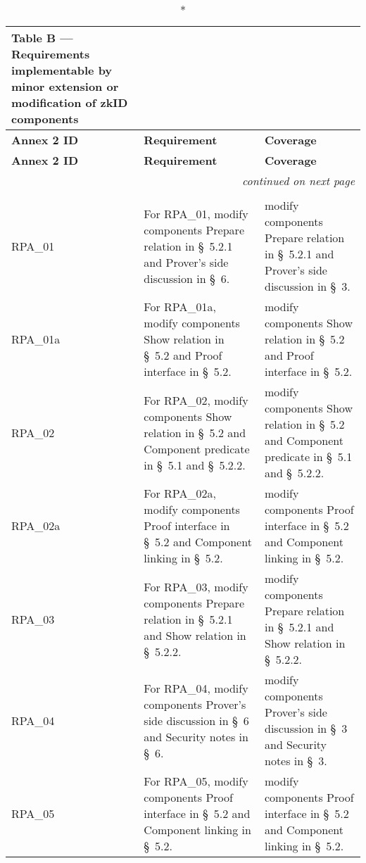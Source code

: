 \clearpage
\begin{landscape}
\small
\begin{longtable}{p{3cm} p{10cm} p{7cm}}
\caption*{Table B — Requirements implementable by minor extension or modification of zkID components}\\
\toprule
\textbf{Annex 2 ID} &
\textbf{Requirement} &
\textbf{Coverage} \\
\midrule
\endfirsthead
\toprule
\textbf{Annex 2 ID} &
\textbf{Requirement} &
\textbf{Coverage} \\
\midrule
\endhead
\midrule
\multicolumn{3}{r}{\emph{continued on next page}}\\
\bottomrule
\endfoot
\bottomrule
\endlastfoot

\multicolumn{3}{l}{\textbf{Topic 6 — Relying Party authentication and User approval}}\\

RPA\_01 &
For RPA\_01, modify components Prepare relation in \S~5.2.1 and Prover's side discussion in \S~6. &
modify components Prepare relation in \S~5.2.1 and Prover's side discussion in \S~3. \\

RPA\_01a &
For RPA\_01a, modify components Show relation in \S~5.2 and Proof interface in \S~5.2. &
modify components Show relation in \S~5.2 and Proof interface in \S~5.2. \\

RPA\_02 &
For RPA\_02, modify components Show relation in \S~5.2 and Component predicate in \S~5.1 and \S~5.2.2. &
modify components Show relation in \S~5.2 and Component predicate in \S~5.1 and \S~5.2.2. \\

RPA\_02a &
For RPA\_02a, modify components Proof interface in \S~5.2 and Component linking in \S~5.2. &
modify components Proof interface in \S~5.2 and Component linking in \S~5.2. \\

RPA\_03 &
For RPA\_03, modify components Prepare relation in \S~5.2.1 and Show relation in \S~5.2.2. &
modify components Prepare relation in \S~5.2.1 and Show relation in \S~5.2.2. \\

RPA\_04 &
For RPA\_04, modify components Prover's side discussion in \S~6 and Security notes in \S~6. &
modify components Prover's side discussion in \S~3 and Security notes in \S~3. \\

RPA\_05 &
For RPA\_05, modify components Proof interface in \S~5.2 and Component linking in \S~5.2. &
modify components Proof interface in \S~5.2 and Component linking in \S~5.2. \\


\end{longtable}
\end{landscape}
